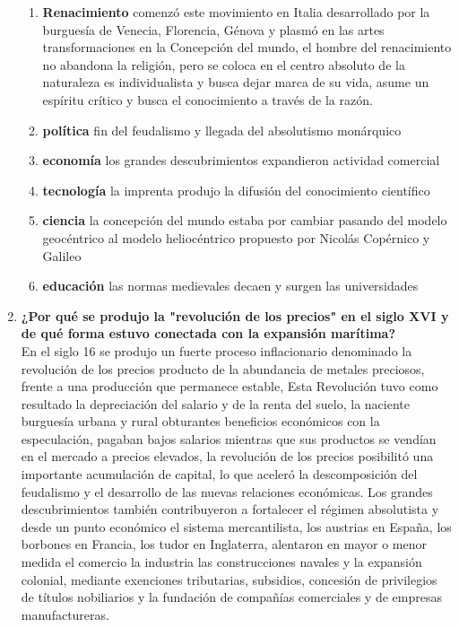 \documentclass[12pt]{book}
\begin{document}
\begin{enumerate}
\begin{enumerate}
\item \textbf{Renacimiento} comenzó este movimiento en Italia desarrollado por la burguesía de Venecia, Florencia, Génova y plasmó en las artes transformaciones en la Concepción del mundo, el hombre del renacimiento no abandona la religión, pero se coloca en el centro absoluto de la naturaleza es individualista y busca dejar marca de su vida, asume un espíritu crítico y busca el conocimiento a través de la razón.
\item \textbf{política} fin del feudalismo y llegada del absolutismo monárquico
\item  \textbf{economía} los grandes descubrimientos expandieron actividad comercial
\item  \textbf{tecnología} la imprenta produjo la difusión del conocimiento científico
\item  \textbf{ciencia} la concepción del mundo estaba por cambiar pasando del modelo geocéntrico al modelo heliocéntrico propuesto por Nicolás Copérnico y Galileo
\item  \textbf{educación} las normas medievales decaen y surgen las universidades 
\end{enumerate}

\item \textbf{¿Por qué se produjo la "revolución de los precios" en el siglo XVI y de qué forma
estuvo conectada con la expansión marítima?}\\
En el siglo 16 se produjo un fuerte proceso inflacionario denominado la revolución de los precios producto de la abundancia de metales preciosos, frente a una producción que permanece estable, Esta Revolución tuvo como resultado la depreciación del salario y de la renta del suelo, la naciente burguesía urbana y rural obturantes beneficios económicos con la especulación, pagaban bajos salarios mientras que sus productos se vendían en el mercado a precios elevados, la revolución de los precios posibilitó una importante acumulación de capital, lo que aceleró la descomposición del feudalismo y el desarrollo de las nuevas relaciones económicas.
Los grandes descubrimientos también contribuyeron a fortalecer el régimen absolutista y desde un punto económico el sistema mercantilista, los austrias en España, los borbones en Francia, los tudor en Inglaterra, alentaron en mayor o menor medida el comercio la industria las construcciones navales y la expansión colonial, mediante exenciones tributarias, subsidios, concesión de privilegios de títulos nobiliarios y la fundación de compañías comerciales y de empresas manufactureras.



\end{enumerate}
\end{document}
